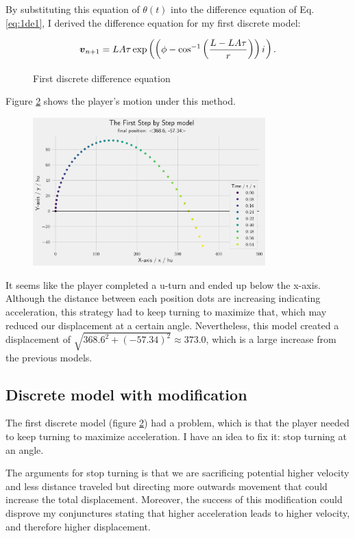 By substituting this equation of $\theta(t)$ into the difference equation of Eq.\ref{eq:1de1}, I derived the difference equation for my first discrete model:
\begin{figure}[H]
    \centering
    \[
        \boldsymbol{v}_{n+1} = LA\tau \exp\left(\left(\phi - \cos^{-1}\left(\frac{L-LA\tau}{r}\right)\right) {i\mkern1mu}\right).
    \]
    \caption{First discrete difference equation}
    \label{fig:sbs}
\end{figure}

Figure \ref{fig:1sbs} shows the player's motion under this method.

\begin{figure}[H]
    \centering
    \includegraphics[width=0.8\textwidth]{assets/step_by_step_1.png}
    \caption{}
    \label{fig:1sbs}
\end{figure}

It seems like the player completed a u-turn and ended up below the x-axis. Although the distance between each position dots are increasing indicating acceleration, this strategy had to keep turning to maximize that, which may reduced our displacement at a certain angle. Nevertheless, this model created a displacement of $\sqrt{368.6^2 + (-57.34)^2} \approx 373.0$, which is a large increase from the previous models.

\subsection{Discrete model with modification}
The first discrete model (figure \ref{fig:1sbs}) had a problem, which is that the player needed to keep turning to maximize acceleration. I have an idea to fix it: stop turning at an angle.

The arguments for stop turning is that we are sacrificing potential higher velocity and less distance traveled but directing more outwards movement that could increase the total displacement. Moreover, the success of this modification could disprove my conjunctures stating that higher acceleration leads to higher velocity, and therefore higher displacement.


